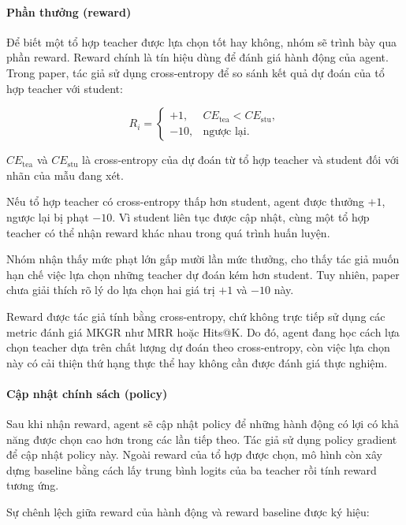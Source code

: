 \paragraph{Phần thưởng (reward)}


Để biết một tổ hợp teacher được lựa chọn tốt hay không, nhóm sẽ trình bày
qua phần reward. Reward chính là tín hiệu dùng để đánh giá hành động của agent. Trong paper, tác giả sử dụng
cross-entropy để so sánh kết quả dự đoán của tổ hợp teacher với student:


\begin{equation}
R_i=
\begin{cases}
+1, & CE_{\mathrm{tea}}<CE_{\mathrm{stu}},\\
-10, & \text{ngược lại}.
\end{cases}
\end{equation}

$CE_{\mathrm{tea}}$ và $CE_{\mathrm{stu}}$
là cross-entropy của dự đoán từ tổ hợp teacher và
student đối với nhãn của mẫu đang xét.

Nếu tổ hợp teacher có cross-entropy thấp hơn student, agent được thưởng $+1$, ngược lại bị phạt $-10$. Vì student liên tục được cập nhật, cùng một tổ hợp teacher có thể nhận reward khác nhau trong quá trình huấn luyện.

Nhóm nhận thấy mức phạt lớn gấp mười lần mức thưởng, cho thấy tác giả muốn hạn chế việc lựa chọn những teacher dự đoán kém hơn student. Tuy nhiên, paper chưa giải thích rõ lý do lựa chọn hai giá trị $+1$ và $-10$ này.

Reward được tác giả tính bằng cross-entropy, chứ không trực tiếp sử dụng các
metric đánh giá MKGR như MRR hoặc Hits@K. Do đó,
agent đang học cách lựa chọn teacher dựa trên chất
lượng dự đoán theo cross-entropy, còn việc lựa chọn
này có cải thiện thứ hạng thực thể hay không cần
được đánh giá thực nghiệm.

\paragraph{Cập nhật chính sách (policy)}


Sau khi nhận reward, agent sẽ cập nhật policy để những hành động có lợi có khả năng được chọn cao hơn trong các lần tiếp theo. Tác giả sử dụng policy gradient để cập nhật policy này. Ngoài reward của tổ hợp được chọn, mô hình còn xây dựng baseline bằng cách lấy trung bình logits của ba teacher rồi tính reward tương ứng.


Sự chênh lệch giữa reward của hành động và reward
baseline được ký hiệu:

